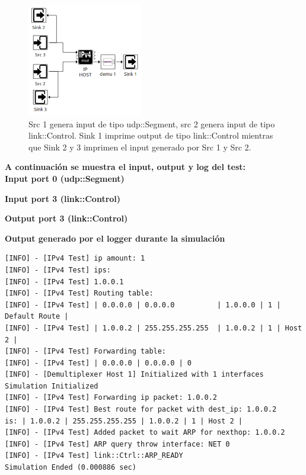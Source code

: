 \documentclass[10pt,a4paper]{article}
\begin{document}
\begin{figure}[!t]
    \centering
    \includegraphics[width = 0.45\textwidth]{img/png/unit_tests/ip_host.png}
    \caption{Src 1 genera input de tipo udp::Segment, src 2 genera input de tipo link::Control. Sink 1 imprime output de tipo link::Control mientras que Sink 2 y 3 imprimen el input generado por Src 1 y Src 2.}
    \label{figure: unit test ip host}
\end{figure}

\textbf{A continuación se muestra el input, output y log del test:} \\

\textbf{Input port 0 (udp::Segment)}


\newpage

\textbf{Input port 3 (link::Control)}


\textbf{Output port 3 (link::Control)}


\newpage

\textbf{Output generado por el logger durante la simulación}
\begin{lstlisting}
[INFO] - [IPv4 Test] ip amount: 1
[INFO] - [IPv4 Test] ips:
[INFO] - [IPv4 Test] 1.0.0.1
[INFO] - [IPv4 Test] Routing table:
[INFO] - [IPv4 Test] | 0.0.0.0 | 0.0.0.0          | 1.0.0.0 | 1 | Default Route |
[INFO] - [IPv4 Test] | 1.0.0.2 | 255.255.255.255  | 1.0.0.2 | 1 | Host 2 |
[INFO] - [IPv4 Test] Forwarding table:
[INFO] - [IPv4 Test] | 0.0.0.0 | 0.0.0.0 | 0 
[INFO] - [Demultiplexer Host 1] Initialized with 1 interfaces
Simulation Initialized
[INFO] - [IPv4 Test] Forwarding ip packet: 1.0.0.2
[INFO] - [IPv4 Test] Best route for packet with dest_ip: 1.0.0.2 
is: | 1.0.0.2 | 255.255.255.255 | 1.0.0.2 | 1 | Host 2 | 
[INFO] - [IPv4 Test] Added packet to wait ARP for nexthop: 1.0.0.2
[INFO] - [IPv4 Test] ARP query throw interface: NET 0
[INFO] - [IPv4 Test] link::Ctrl::ARP_READY
Simulation Ended (0.000886 sec)
\end{lstlisting}
\end{document}
